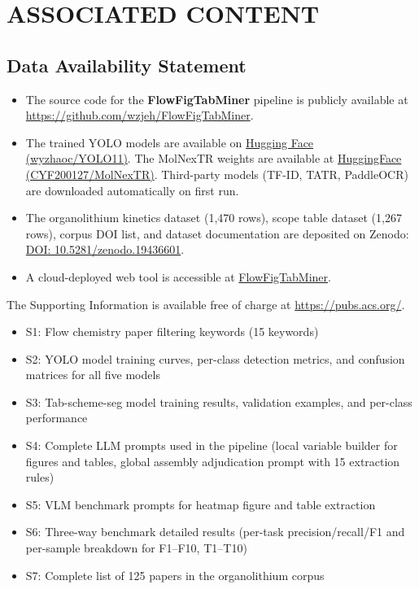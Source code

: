 \documentclass[journal=jcisd8,manuscript=article]{achemso}
\begin{document}
\section{ASSOCIATED CONTENT}
\subsection{Data Availability Statement}
\label{dataset}
\begin{itemize}
  \item The source code for the \textbf{FlowFigTabMiner} pipeline is publicly available at \href{https://github.com/wzjeh/FlowFigTabMiner}{\url{https://github.com/wzjeh/FlowFigTabMiner}}.
  \item The trained YOLO models are available on \href{https://huggingface.co/wyzhaoc/YOLO11}{Hugging Face (wyzhaoc/YOLO11)}.
  The MolNexTR weights\cite{Xu2024molnextr} are available at \href{https://huggingface.co/datasets/CYF200127/MolNexTR}{HuggingFace (CYF200127/MolNexTR)}.
  Third-party models (TF-ID, TATR, PaddleOCR) are downloaded automatically on first run.
  \item The organolithium kinetics dataset (1{,}470 rows), scope table dataset (1{,}267 rows), corpus DOI list, and dataset documentation are deposited on Zenodo: \href{https://doi.org/10.5281/zenodo.19436601}{DOI: 10.5281/zenodo.19436601}.
  \item A cloud-deployed web tool is accessible at \href{https://frontend-service-903119038444.us-central1.run.app}{FlowFigTabMiner}.
\end{itemize}

\begin{suppinfo}
The Supporting Information is available free of charge at
\url{https://pubs.acs.org/}.
\begin{itemize}
  \item S1: Flow chemistry paper filtering keywords (15 keywords)
  \item S2: YOLO model training curves, per-class detection metrics, and confusion matrices for all five models
  \item S3: Tab-scheme-seg model training results, validation examples, and per-class performance
  \item S4: Complete LLM prompts used in the pipeline (local variable builder for figures and tables, global assembly adjudication prompt with 15 extraction rules)
  \item S5: VLM benchmark prompts for heatmap figure and table extraction
  \item S6: Three-way benchmark detailed results (per-task precision/recall/F1 and per-sample breakdown for F1--F10, T1--T10)
  \item S7: Complete list of 125 papers in the organolithium corpus
\end{itemize}
\end{suppinfo}
\end{document}
